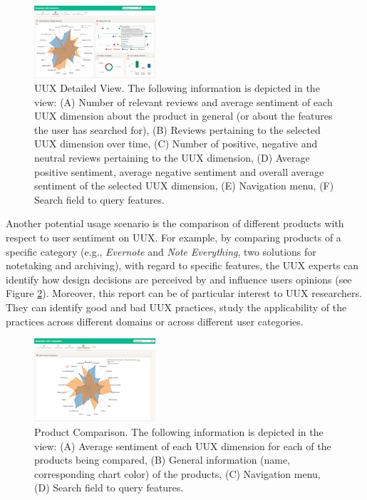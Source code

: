 		\begin{figure}[ht]
		\raggedleft
  			\includegraphics[width=0.4\textwidth]{img/introduction_scenario2.png}
			\caption{UUX Detailed View. The following information is depicted in the view: (A) Number of relevant reviews and average sentiment of each UUX dimension about the product in general (or about the features the user has searched for), (B) Reviews pertaining to the selected UUX dimension over time, (C) Number of positive, negative and neutral reviews pertaining to the UUX dimension, (D) Average positive sentiment, average negative sentiment and overall average sentiment of the selected UUX dimension, (E) Navigation menu, (F) Search field to query features.}
			\label{fig:introduction_scenario2}
		\end{figure}

Another potential usage scenario is the comparison of different products with respect to user sentiment on UUX. For example, by comparing products of a specific category (e.g., \textit{Evernote} and \textit{Note Everything}, two solutions for notetaking and archiving), with regard to specific features, the UUX experts can identify how design decisions are perceived by and influence users opinions (see Figure \ref{fig:introduction_scenario3}). Moreover, this report can be of particular interest to UUX researchers. They can identify good and bad UUX practices, study the applicability of the practices across different domains or across different user categories.

		\begin{figure}[ht]
		\raggedleft
  			\includegraphics[width=0.4\textwidth]{img/introduction_scenario3.png}
			\caption{Product Comparison. The following information is depicted in the view: (A) Average sentiment of each UUX dimension for each of the products being compared, (B) General information (name, corresponding chart color) of the products, (C) Navigation menu, (D) Search field to query features.}
			\label{fig:introduction_scenario3}
		\end{figure}
